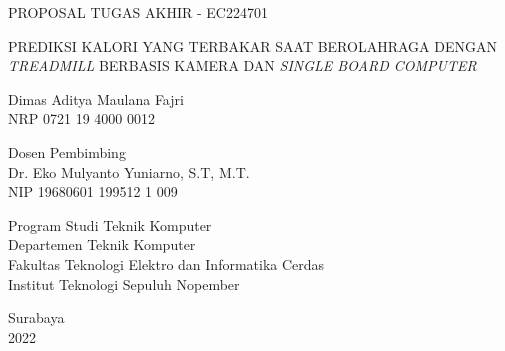 PROPOSAL TUGAS AKHIR - EC224701

\vspace{6ex}

\begin{large}
  PREDIKSI KALORI YANG TERBAKAR SAAT BEROLAHRAGA DENGAN \emph{TREADMILL} BERBASIS KAMERA DAN \emph{SINGLE BOARD COMPUTER}
\end{large}

\vspace{4ex}

Dimas Aditya Maulana Fajri \\
NRP 0721 19 4000 0012

\vspace{2ex}

Dosen Pembimbing \\
Dr. Eko Mulyanto Yuniarno, S.T, M.T. \\
NIP 19680601 199512 1 009

\vspace{6ex}

Program Studi Teknik Komputer \\
Departemen Teknik Komputer \\
Fakultas Teknologi Elektro dan Informatika Cerdas \\
Institut Teknologi Sepuluh Nopember

Surabaya\\
2022
